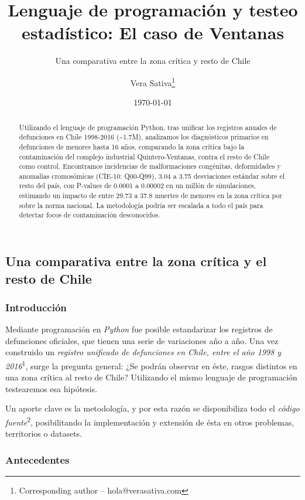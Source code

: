 \documentclass[]{article}
\title{Lenguaje de programación y testeo estadístico: El caso de Ventanas}
\subtitle{Una comparativa entre la zona crítica y resto de Chile}
\author{Vera Sativa\footnote{Corresponding author – hola@verasativa.com}}
\date{\today}
\begin{document}
\maketitle
\begin{abstract}
Utilizando el lenguaje de programación Python, tras unificar los
registros anuales de defunciones en Chile 1998-2016
(\textasciitilde{}1.7M), analizamos los diagnósticos primarios en
defunciones de menores hasta 16 años, comparando la zona crítica bajo la
contaminación del complejo industrial Quintero-Ventanas, contra el resto
de Chile como control. Encontramos incidencias de malformaciones
congénitas, deformidades y anomalías cromosómicas (CIE-10: Q00-Q99),
3.04 a 3.75 desviaciones estándar sobre el resto del país, con P-values
de 0.0001 a 0.00002 en un millón de simulaciones, estimando un impacto
de entre 29.73 a 37.8 muertes de menores en la zona crítica por sobre la
norma nacional. La metodología podría ser escalada a todo el país para
detectar focos de contaminación desconocidos.
\end{abstract}

\hypertarget{una-comparativa-entre-la-zona-cruxedtica-y-el-resto-de-chile}{%
\subsection{Una comparativa entre la zona crítica y el resto de
Chile}\label{una-comparativa-entre-la-zona-cruxedtica-y-el-resto-de-chile}}

\hypertarget{introducciuxf3n}{%
\subsubsection{Introducción}\label{introducciuxf3n}}

Mediante programación en \emph{Python} fue posible estandarizar los
registros de defunciones oficiales, que tienen una serie de variaciones
año a año. Una vez construido un \emph{registro
unificado de defunciones en Chile, entre el año 1998 y 2016}\textsuperscript{{1}}, surge la
pregunta general: ¿Se podrán observar en éste, rasgos distintos en una
zona crítica al resto de Chile? Utilizando el mismo lenguaje de
programación testearemos esa hipótesis.

Un aporte clave es la metodología, y por esta razón se disponibiliza todo el \emph{código fuente}\textsuperscript{{2}}, posibilitando la implementación y extensión de ésta en otros problemas, territorios o datasets. 

\hypertarget{antecedentes}{%
\subsubsection{Antecedentes}\label{antecedentes}}
\end{document}
